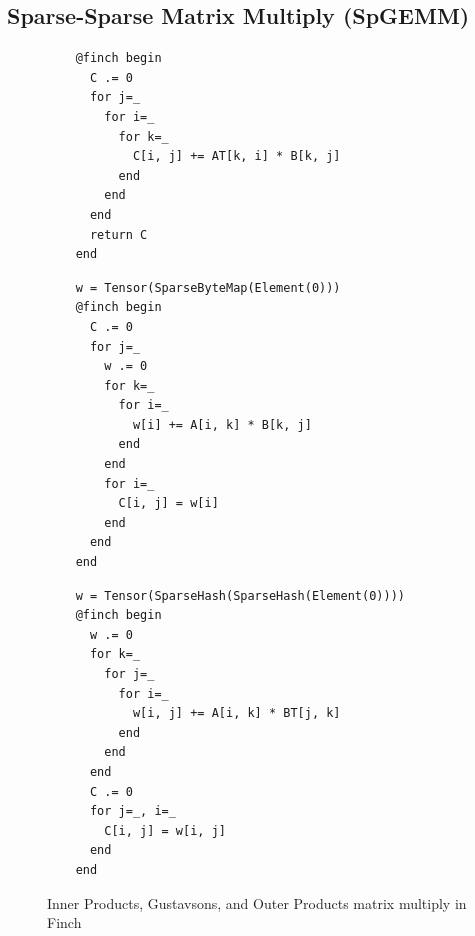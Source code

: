 \subsection{Sparse-Sparse Matrix Multiply (SpGEMM)}

\begin{figure}[b]
    \begin{minipage}[t]{0.32\linewidth}
      \vspace{0pt}
    \begin{verbatim}
    @finch begin
      C .= 0
      for j=_
        for i=_
          for k=_
            C[i, j] += AT[k, i] * B[k, j]
          end
        end
      end
      return C
    end
    \end{verbatim}
    \end{minipage}%
    \begin{minipage}[t]{0.33\linewidth}
      \vspace{0pt}
    \begin{verbatim}
    w = Tensor(SparseByteMap(Element(0)))
    @finch begin
      C .= 0
      for j=_
        w .= 0
        for k=_
          for i=_
            w[i] += A[i, k] * B[k, j]
          end
        end
        for i=_
          C[i, j] = w[i]
        end
      end
    end
    \end{verbatim}
    \end{minipage}%
    \begin{minipage}[t]{0.35\linewidth}
      \vspace{0pt}
    \begin{verbatim}
    w = Tensor(SparseHash(SparseHash(Element(0))))
    @finch begin
      w .= 0
      for k=_
        for j=_
          for i=_
            w[i, j] += A[i, k] * BT[j, k]
          end
        end
      end
      C .= 0
      for j=_, i=_
        C[i, j] = w[i, j]
      end
    end
    \end{verbatim}
    \end{minipage}
    \caption{Inner Products, Gustavsons, and Outer Products matrix multiply in Finch}\label{fig:spgemm_listing}
\end{figure}


